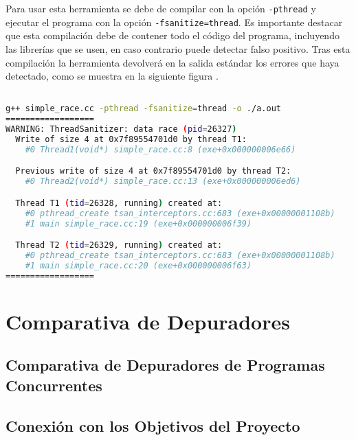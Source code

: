 Para usar esta herramienta se debe de compilar con la opción \texttt{-pthread} y ejecutar el programa con la opción \texttt{-fsanitize=thread}. Es importante destacar que esta \gls{compilación} debe de contener todo el código del programa, incluyendo las librerías que se usen, en caso contrario puede detectar \gls{falso positivo}. Tras esta \gls{compilación} la herramienta devolverá en la \gls{salida estándar} los errores que haya detectado, como se muestra en la siguiente figura \cite{ThreadSanitizer}.

\begin{lstlisting}[language=bash, caption={Muestra de salida de ThreadSanitizer al detectar un error de condición de carrera \cite{ThreadSanitizerGithub}}]

g++ simple_race.cc -pthread -fsanitize=thread -o ./a.out 
==================
WARNING: ThreadSanitizer: data race (pid=26327)
  Write of size 4 at 0x7f89554701d0 by thread T1:
    #0 Thread1(void*) simple_race.cc:8 (exe+0x000000006e66)

  Previous write of size 4 at 0x7f89554701d0 by thread T2:
    #0 Thread2(void*) simple_race.cc:13 (exe+0x000000006ed6)

  Thread T1 (tid=26328, running) created at:
    #0 pthread_create tsan_interceptors.cc:683 (exe+0x00000001108b)
    #1 main simple_race.cc:19 (exe+0x000000006f39)

  Thread T2 (tid=26329, running) created at:
    #0 pthread_create tsan_interceptors.cc:683 (exe+0x00000001108b)
    #1 main simple_race.cc:20 (exe+0x000000006f63)
==================

\end{lstlisting}

\section{Comparativa de Depuradores}\label{sec:comparativa-depuradores}

\subsection{Comparativa de Depuradores de Programas Concurrentes}{\label{subsec:comparativa-depuradores-concurrentes}}

\subsection{Conexión con los Objetivos del Proyecto}{\label{subsec:conexión-objetivos-proyecto}}





